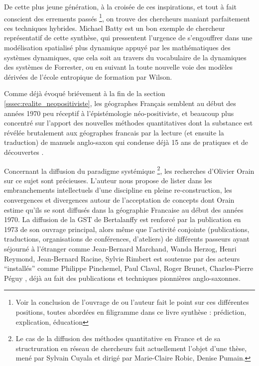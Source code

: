 De cette plus jeune génération, à la croisée de ces inspirations, et tout à fait conscient des errements passés \footnote{Voir la conclusion de l'ouvrage de \textcite[357]{Batty1976} ou l'auteur fait le point sur ces différentes positions, toutes abordées en filigramme dans ce livre synthèse : prédiction, explication, éducation }, on trouve des chercheurs maniant parfaitement ces techniques hybrides. Michael Batty est un bon exemple de chercheur représentatif de cette synthèse, qui pressentent l'urgence de s'engouffrer dans une modélisation spatialisé plus dynamique \autocite{Batty1971} appuyé par les mathématiques des systèmes dynamiques, que cela soit au travers du vocabulaire de la dynamiques des systèmes de Forrester, ou en suivant la toute nouvelle voie des modèles dérivées de l'école entropique de formation par Wilson.



Comme déjà évoqué briévement à la fin de la section \ref{sssec:realite_neopositiviste}, les géographes Français semblent au début des années 1970 peu réceptif à l'épistémologie néo-positiviste, et beaucoup plus concentré sur l'apport des nouvelles méthodes quantitatives dont la substance est révélée brutalement aux géographes francais par la lecture (et ensuite la traduction) de manuels anglo-saxon qui condense déjà 15 ans de pratiques et de découvertes \autocite[129]{Pumain2002}.

Concernant la diffusion du paradigme systémique \footnote{Le cas de la diffusion des méthodes quantitative en France et de sa structruration en réseau de chercheurs fait actuellement l'objet d'une thèse, mené par Sylvain Cuyala et dirigé par Marie-Claire Robic, Denise Pumain.}, les recherches d'Olivier Orain \autocite{Orain2001} sur ce sujet sont précieuses. L'auteur nous propose de lister dans les embranchements intellectuels d'une discipline en pleine re-construction, les convergences et divergences autour de l'acceptation de concepts dont Orain estime qu'ils se sont diffusés dans la géographie Francaise au début des années 1970. La diffusion de la GST de Bertalanffy est renforcé par la publication en 1973 de son ouvrage principal, alors même que l'activité conjointe (publications, traductions, organisations de conférences, d'ateliers) de différents passeurs ayant séjourné à l'étranger comme Jean-Bernard Marchand, Wanda Herzog, Henri Reymond, Jean-Bernard Racine, Sylvie Rimbert est soutenue par des acteurs \enquote{installés} comme Philippe Pinchemel, Paul Claval, Roger Brunet, Charles-Pierre Péguy \autocite{Pumain2002,Cauvin2007}, déjà au fait des publications et techniques pionnières anglo-saxonnes. 

